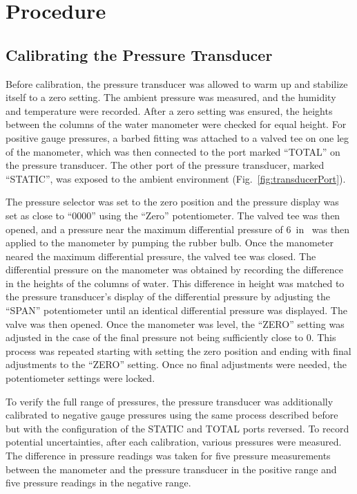 \documentclass[journal,letterpaper]{IEEEtran}
\begin{document}
\section{Procedure}

\subsection{Calibrating the Pressure Transducer}

Before calibration, the pressure transducer was allowed to warm up and stabilize itself to a zero setting.
The ambient pressure was measured, and the humidity and temperature were recorded.
After a zero setting was ensured, the heights between the columns of the water manometer were checked for equal height.
For positive gauge pressures, a barbed fitting was attached to a valved tee on one leg of the manometer, which was then connected to the port marked “TOTAL” on the pressure transducer.
The other port of the pressure transducer, marked “STATIC”, was exposed to the ambient environment (Fig.~\ref{fig:transducerPort}).

The pressure selector was set to the zero position and the pressure display was set as close to “0000” using the “Zero” potentiometer.
The valved tee was then opened, and a pressure near the maximum differential pressure of \qty{6}{in} was then applied to the manometer by pumping the rubber bulb.
Once the manometer neared the maximum differential pressure, the valved tee was closed.
The differential pressure on the manometer was obtained by recording the difference in the heights of the columns of water.
This difference in height was matched to the pressure transducer's display of the differential pressure by adjusting the “SPAN” potentiometer until an identical differential pressure was displayed.
The valve was then opened.
Once the manometer was level, the “ZERO” setting was adjusted in the case of the final pressure not being sufficiently close to 0.
This process was repeated starting with setting the zero position and ending with final adjustments to the “ZERO” setting.
Once no final adjustments were needed, the potentiometer settings were locked.

To verify the full range of pressures, the pressure transducer was additionally calibrated to negative gauge pressures using the same process described before but with the configuration of the STATIC and TOTAL ports reversed.
To record potential uncertainties, after each calibration, various pressures were measured.
The difference in pressure readings was taken for five pressure measurements between the manometer and the pressure transducer in the positive range and five pressure readings in the negative range.
\end{document}
